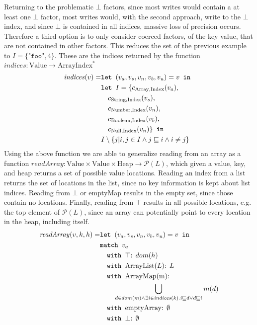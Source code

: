 Returning to the problematic $\bot$ factors, since most writes would contain a at least one $\bot$ factor, most writes would, with the second approach, write to the $\bot$ index, and since $\bot$ is contained in all indices, massive loss of precision occurs. Therefore a third option is to only consider coerced factors, of the key value, that are not contained in other factors. This reduces the set of the previous example to $I = \{\texttt{"foo"}, 4\}$. These are the indices returned by the function $\mathit{indices}: \text{Value} \rightarrow \text{ArrayIndex}^*$
\newcommand{\is}{\texttt{ is }}
\begin{align}
    \mathit{indices}(v) =    &\texttt{let } (v_a,v_s, v_n, v_b, v_u) = v \texttt{ in }\notag\\
                    & \texttt{let } I = \{ c_{\text{Array}, \text{Index}}(v_a),\notag\\
                    &\quad c_{\text{String}, \text{Index}}(v_s),\notag\\
                    &\quad c_{\text{Number}, \text{Index}}(v_n),\notag\\
                    &\quad c_{\text{Boolean}, \text{Index}}(v_b),\notag\\
                    &\quad c_{\text{Null}, \text{Index}}(v_n) \} \texttt{ in }\notag\\
                    &I \setminus \{j|i,j\in I \wedge j\sqsubseteq i \wedge i \neq j \}
\end{align}
Using the above function we are able to generalize reading from an array as a function $\mathit{readArray}: \text{Value} \times \text{Value} \times \text{Heap} \rightarrow \mathcal{P}(L)$, which given a value, key, and heap returns a set of possible value locations. Reading an index from a list returns the set of locations in the list, since no key information is kept about list indices. Reading from $\bot$ or emptyMap results in the empty set, since those contain no locations. Finally, reading from $\top$ results in all possible locations, e.g. the top element of $\mathcal{P}(L)$, since an array can potentially point to every location in the heap, including itself.
\begin{align}
\mathit{readArray}(v,k,h) =            &\texttt{let } (v_a,v_s,v_n,v_b,v_u) = v \texttt{ in }\notag\\
                            &\texttt{match }v_a\notag\\
                            &\quad\texttt{with }\top\text{: } dom(h) \notag\\
                            &\quad\texttt{with }\text{ArrayList}(L)\text{: } L \notag\\
                            &\quad\texttt{with }\text{ArrayMap(m)}\text{: } \notag\\
                            & \quad\quad \bigcup_{d \in dom(m) \wedge \exists i \in \mathit{indices}(k).i\sqsubseteq d \vee d \sqsubseteq i } m(d)\notag\\
                            &\quad\texttt{with }\text{emptyArray}\text{: } \emptyset \notag\\
                            &\quad\texttt{with }\bot\text{: } \emptyset
\end{align}

